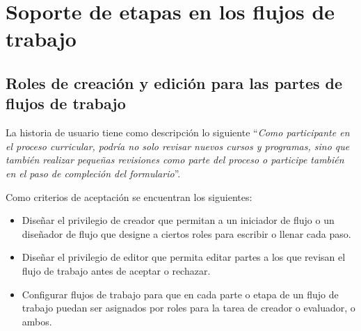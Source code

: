 \section{Soporte de etapas en los flujos de trabajo}
\begin{table}[H]
\centering
{}
\caption{Historias de usuario para soporte de etapas en los flujos de trabajo}
\label{epic:8}
\end{table}

\subsection{Roles de creación y edición para las partes de flujos de trabajo}
La historia de usuario tiene como descripción lo siguiente \enquote{\textit{Como participante en el proceso curricular, podría no solo revisar nuevos cursos y programas, sino que también realizar pequeñas revisiones como parte del proceso o participe también en el paso de compleción del formulario}}.

Como criterios de aceptación se encuentran los siguientes:
\begin{itemize}
	\item Diseñar el privilegio de creador que permitan a un iniciador de flujo o un diseñador de flujo que designe a ciertos roles para escribir o llenar cada paso.
	\item Diseñar el privilegio de editor que permita editar partes a los que revisan el flujo de trabajo antes de aceptar o rechazar.
	\item Configurar flujos de trabajo para que en cada parte o etapa de un flujo de trabajo puedan ser asignados por roles para la tarea de creador o evaluador, o ambos.
\end{itemize}

